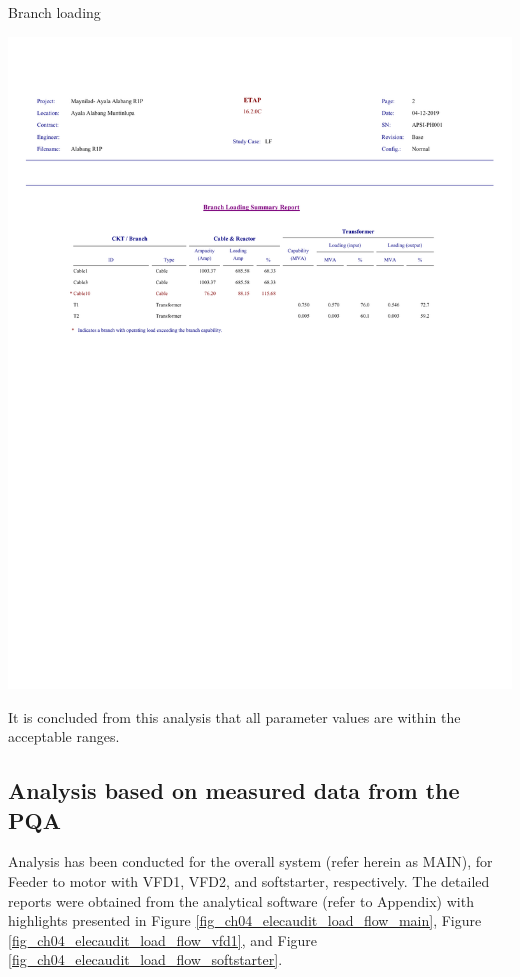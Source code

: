 \begin{table}[]
	\caption{Branch loading}
	\label{tbl_ch04_elecaudit_load_flow_analysis03}
	\includegraphics[width=\textwidth]{tables/tbl_ch04_elecaudit_load_flow_analysis03.pdf}		
\end{table}

It is concluded from this analysis that all parameter values are within the acceptable ranges.

%


\subsection{Analysis based on measured data from the PQA}
Analysis has been conducted for the overall system (refer herein as MAIN), for Feeder to motor with VFD1, VFD2, and softstarter, respectively. The detailed reports were obtained from the analytical software (refer to Appendix) with highlights presented in Figure \ref{fig_ch04_elecaudit_load_flow_main}, Figure \ref{fig_ch04_elecaudit_load_flow_vfd1}, and Figure \ref{fig_ch04_elecaudit_load_flow_softstarter}.

